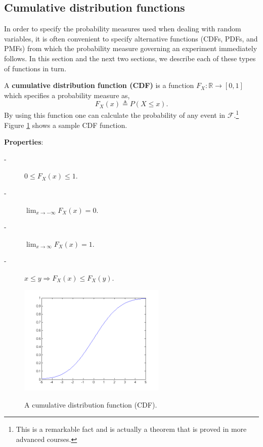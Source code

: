 \documentclass{article}
\begin{document}
\subsection{Cumulative distribution functions}

In order to specify the probability measures used when dealing with
random variables, it is often convenient to specify alternative
functions (CDFs, PDFs, and PMFs) from which the probability measure
governing an experiment immediately follows.  In this section and the
next two sections, we describe each of these types of functions in
turn.

A \textbf{cumulative distribution function (CDF)} is a function $F_X:\mathbb{R} \rightarrow [0,1]$ which specifies a probability measure as,
\begin{equation}
F_X(x) \triangleq P(X \leq x).
\end{equation}
By using this function one can calculate the probability of any event in $\mathcal{F}$.\footnote{This is a remarkable fact and is actually a theorem that is proved in more advanced courses.} %
Figure \ref{fig1} shows a sample CDF function.

\textbf{Properties}:
\begin{description}
\item[-] $0 \leq F_X(x) \leq 1$.
\item[-] $\lim_{x \rightarrow -\infty} F_X(x)=0$.
\item[-] $\lim_{x \rightarrow \infty} F_X(x)=1$.
\item[-] $x \leq y \Longrightarrow F_X(x)\leq F_X(y)$.
\end{description}

\begin{figure}
\begin{center}
  \includegraphics[width=7cm]{fig1}\\
  \caption{A cumulative distribution function (CDF).}\label{fig1}
\end{center}
\end{figure}
\end{document}
